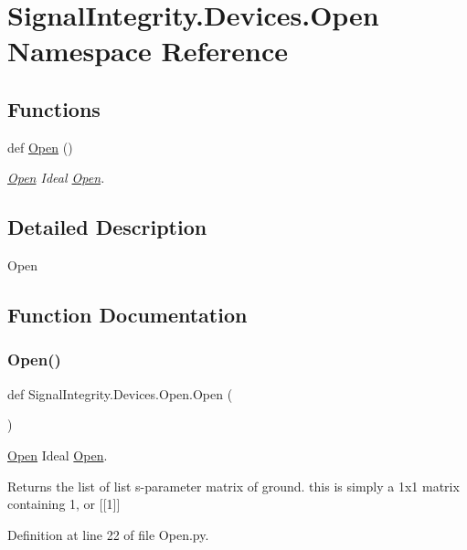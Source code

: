 \hypertarget{namespaceSignalIntegrity_1_1Devices_1_1Open}{}\section{Signal\+Integrity.\+Devices.\+Open Namespace Reference}
\label{namespaceSignalIntegrity_1_1Devices_1_1Open}
\subsection*{Functions}
\begin{DoxyCompactItemize}
\item 
def \hyperlink{namespaceSignalIntegrity_1_1Devices_1_1Open_a620fa0b6871c826c7bb95af2d2aa0c00}{Open} ()
\begin{DoxyCompactList}\small\item\em \hyperlink{namespaceSignalIntegrity_1_1Devices_1_1Open}{Open} Ideal \hyperlink{namespaceSignalIntegrity_1_1Devices_1_1Open}{Open}. \end{DoxyCompactList}\end{DoxyCompactItemize}


\subsection{Detailed Description}
\begin{DoxyVerb}Open\end{DoxyVerb}
 

\subsection{Function Documentation}
\mbox{\label{namespaceSignalIntegrity_1_1Devices_1_1Open_a620fa0b6871c826c7bb95af2d2aa0c00}} 
\subsubsection{\texorpdfstring{Open()}{Open()}}
{\footnotesize\ttfamily def Signal\+Integrity.\+Devices.\+Open.\+Open (\begin{DoxyParamCaption}{ }\end{DoxyParamCaption})}



\hyperlink{namespaceSignalIntegrity_1_1Devices_1_1Open}{Open} Ideal \hyperlink{namespaceSignalIntegrity_1_1Devices_1_1Open}{Open}. 

\begin{DoxyReturn}{Returns}
the list of list s-\/parameter matrix of ground. this is simply a 1x1 matrix containing 1, or \mbox{[}\mbox{[}1\mbox{]}\mbox{]} 
\end{DoxyReturn}


Definition at line 22 of file Open.\+py.

